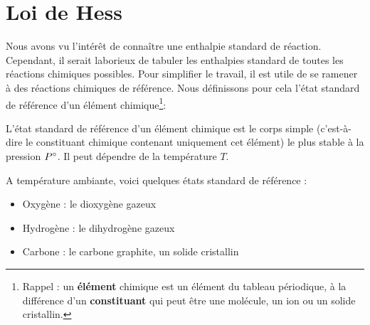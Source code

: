 \documentclass[11pt,fleqn]{book} %
\begin{document}
\section{Loi de Hess}

Nous avons vu l'intérêt de connaître une enthalpie standard de réaction. Cependant, il serait laborieux de tabuler les enthalpies standard de toutes les réactions chimiques possibles. Pour simplifier le travail, il est utile de se ramener à des réactions chimiques de référence. Nous définissons pour cela l'état standard de référence d'un élément chimique\footnote{Rappel : un \textbf{élément} chimique est un élément du tableau périodique, à la différence d'un \textbf{constituant} qui peut être une molécule, un ion ou un solide cristallin.}:
\begin{definition}
    L’état standard de référence d’un élément chimique est le corps simple (c'est-à-dire le constituant chimique contenant uniquement cet élément) le plus stable à la pression $P\degree$. Il peut dépendre de la température $T$.
\end{definition}
\begin{example}
    A température ambiante, voici quelques états standard de référence :
    \begin{itemize}
        \item Oxygène  : le dioxygène gazeux 
        \item Hydrogène  : le dihydrogène gazeux 
        \item Carbone  : le carbone graphite, un solide cristallin 
    \end{itemize}
\end{example}
\end{document}
